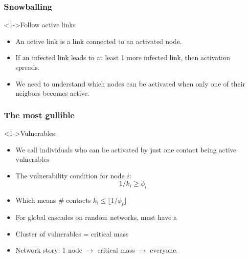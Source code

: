 \begin{frame}
  \frametitle{Snowballing}

  \begin{block}<1->{Follow active links}
    \begin{itemize}
    \item<2-> An active link is a link connected to an activated node.
    \item<3-> If an infected link leads to \alert{at least 1 more infected link},
      then \alert{activation spreads}.
    \item<4-> We need to understand which nodes can be activated when
      only one of their neigbors becomes active.
    \end{itemize}
  \end{block}

\end{frame}


\begin{frame}
  \frametitle{The most gullible}

  \begin{block}<1->{Vulnerables:}
    \begin{itemize}
    \item<2-> We call individuals who can be activated by
    just one contact being active \alert{vulnerables}
    \item<3-> The vulnerability condition for node $i$:
      $$1/k_i \ge \phi_i$$
    \item<4->
      Which means \# contacts  $k_{i} \le \lfloor 1/\phi_i \rfloor$
    \item<5->
      For global cascades on random networks, must have a
      \cite{watts2002a}
    \item<6->
      \alert{Cluster of vulnerables} = \alert{critical mass}
    \item<7->
      Network story: 1 node $\rightarrow$ critical mass $\rightarrow$ everyone.
    \end{itemize}
  \end{block}

   \end{frame}




